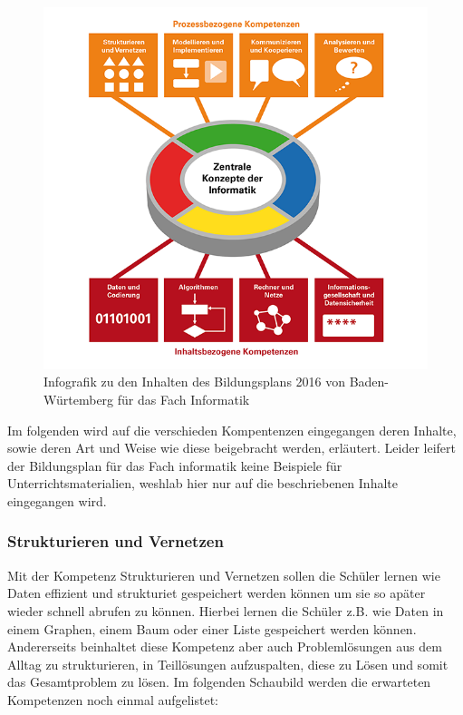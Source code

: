 \begin{figure}[ht]
	\centering
	\includegraphics[width=\textwidth,height=\textheight,keepaspectratio]{images/BildungsplanInformatik.png}
	\caption{Infografik zu den Inhalten des Bildungsplans 2016 von Baden-Würtemberg für das Fach Informatik}
	\label{Bildungsplan Infromatik Infografik}
\end{figure}

Im folgenden wird auf die verschieden Kompentenzen eingegangen deren Inhalte, sowie deren Art und Weise wie diese beigebracht werden, erläutert. Leider leifert der Bildungsplan für das Fach informatik keine Beispiele für Unterrichtsmaterialien, weshlab hier nur auf die beschriebenen Inhalte eingegangen wird.

\subsubsection{Strukturieren und Vernetzen}
Mit der Kompetenz Strukturieren und Vernetzen sollen die Schüler lernen wie Daten effizient und strukturiet gespeichert werden können um sie so apäter wieder schnell abrufen zu können. Hierbei lernen die Schüler z.B. wie Daten in einem Graphen, einem Baum oder einer Liste gespeichert werden können. Andererseits beinhaltet diese Kompetenz aber auch Problemlösungen aus dem Alltag zu strukturieren, in Teillösungen aufzuspalten, diese zu Lösen und somit das Gesamtproblem zu lösen.\cite{StruktVer} Im folgenden Schaubild werden die erwarteten Kompetenzen noch einmal aufgelistet:


